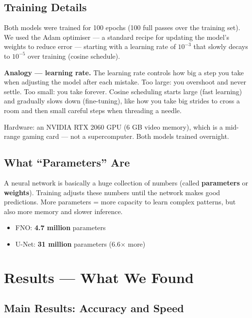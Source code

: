 \documentclass[acmsmall,nonacm]{acmart}
\begin{document}
\subsection{Training Details}

Both models were trained for 100 epochs (100 full passes over the training set).
We used the Adam optimiser --- a standard recipe for updating the model's
weights to reduce error --- starting with a learning rate of $10^{-3}$ that
slowly decays to $10^{-5}$ over training (cosine schedule).

\begin{analogybox}
\textbf{Analogy --- learning rate.}
The learning rate controls how big a step you take when adjusting the model
after each mistake.
Too large: you overshoot and never settle.
Too small: you take forever.
Cosine scheduling starts large (fast learning) and gradually slows down
(fine-tuning), like how you take big strides to cross a room and then small
careful steps when threading a needle.
\end{analogybox}

Hardware: an NVIDIA RTX 2060 GPU (6 GB video memory), which is a mid-range
gaming card --- not a supercomputer.
Both models trained overnight.

\subsection{What ``Parameters'' Are}

A neural network is basically a huge collection of numbers (called
\textbf{parameters} or \textbf{weights}).
Training adjusts these numbers until the network makes good predictions.
More parameters = more capacity to learn complex patterns, but also more memory
and slower inference.

\begin{itemize}
  \item FNO: \textbf{4.7 million} parameters
  \item U-Net: \textbf{31 million} parameters (6.6$\times$ more)
\end{itemize}

\section{Results --- What We Found}

\subsection{Main Results: Accuracy and Speed}
\end{document}
